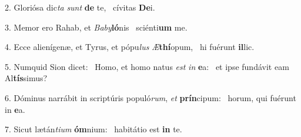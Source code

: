 2. Gloriósa dic\textit{ta} \textit{sunt} \textbf{de} te, \ast\  cívitas \textbf{De}i.\

3. Memor ero Rahab, et \textit{Ba}\textit{by}\textbf{ló}nis \ast\  sciénti\textbf{um} me.\

4. Ecce alienígenæ, et Tyrus, et pópu\textit{lus} \textit{Æ}\textbf{thí}opum, \ast\  hi fuérunt \textbf{il}lic.\

5. Numquid Sion dicet: \dag\  Homo, et homo natus \textit{est} \textit{in} \textbf{e}a: \ast\  et ipse fundávit eam Al\textbf{tís}simus?\

6. Dóminus narrábit in scriptúris populó\textit{rum}, \textit{et} \textbf{prín}cipum: \ast\  horum, qui fuérunt in \textbf{e}a.\

7. Sicut lætán\textit{ti}\textit{um} \textbf{óm}nium: \ast\  habitátio est \textbf{in} te.\

